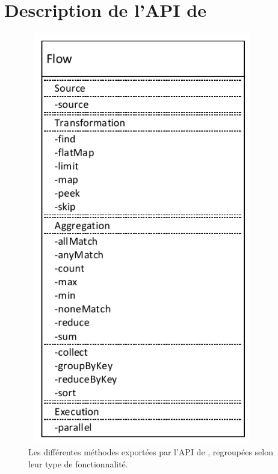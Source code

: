 
\chapter{Description de l'API de \PpFf}
\label{description.chap}




\begin{figure}
\centering
     \includegraphics[height=18cm, width=10cm]{Figures/MethodsAPI.pdf}
      \caption{Les diff\'erentes m\'ethodes export\'ees par l'{API} de \ppff,
     regroup\'ees selon leur type de fonctionnalit\'e.}
       \label{MethodesAPI.fig}
\end{figure}




